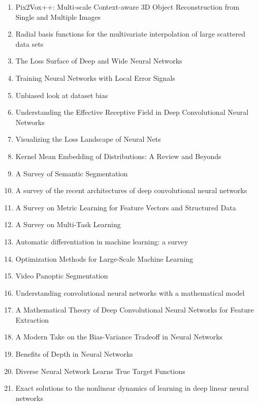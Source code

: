 \documentclass[acmlarge]{acmart}
\begin{document}
\begin{enumerate}
	\item Pix2Vox++: Multi-scale Context-aware 3D Object Reconstruction from Single and Multiple Images \cite{Xie2020Pix2VoxMC}
	\item Radial basis functions for the multivariate interpolation of large scattered data sets \cite{Lazzaro2002RadialBF}
	\item The Loss Surface of Deep and Wide Neural Networks \cite{Nguyen2017TheLS}
	\item Training Neural Networks with Local Error Signals \cite{Nkland2019TrainingNN}
	\item Unbiased look at dataset bias \cite{Torralba2011UnbiasedLA}
	\item Understanding the Effective Receptive Field in Deep Convolutional Neural Networks \cite{Luo2016UnderstandingTE}
	\item Visualizing the Loss Landscape of Neural Nets \cite{Li2018VisualizingTL}
	\item Kernel Mean Embedding of Distributions: A Review and Beyonds \cite{Muandet2017KernelME}
	\item A Survey of Semantic Segmentation \cite{Thoma2016ASO}
	\item A survey of the recent architectures of deep convolutional neural networks \cite{Khan2020ASO}
	\item A Survey on Metric Learning for Feature Vectors and Structured Data \cite{Bellet2013ASO}
	\item A Survey on Multi-Task Learning \cite{Zhang2017ASO}
	\item Automatic differentiation in machine learning: a survey \cite{Baydin2017AutomaticDI}
	\item Optimization Methods for Large-Scale Machine Learning \cite{Bottou2018OptimizationMF}
	\item Video Panoptic Segmentation \cite{Kim2020VideoPS}
	\item Understanding convolutional neural networks with a mathematical model \cite{Kuo2016UnderstandingCN}
	\item A Mathematical Theory of Deep Convolutional Neural Networks for Feature Extraction \cite{Wiatowski2018AMT}
	\item A Modern Take on the Bias-Variance Tradeoff in Neural Networks \cite{Neal2018AMT}
	\item Benefits of Depth in Neural Networks \cite{Telgarsky2016BenefitsOD}
	\item Diverse Neural Network Learns True Target Functions \cite{Xie2017DiverseNN}
	\item Exact solutions to the nonlinear dynamics of learning in deep linear neural networks \cite{Saxe2014ExactST}

\end{enumerate}
\end{document}
